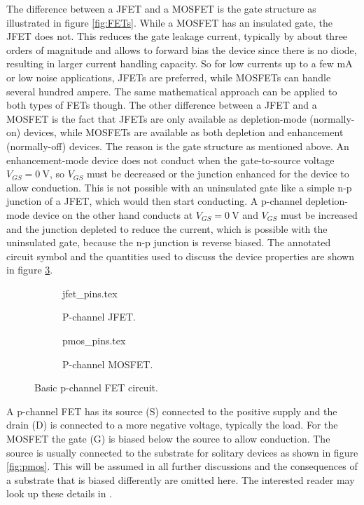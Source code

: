 The difference between a JFET and a MOSFET is the gate structure as illustrated in figure \ref{fig:FETs}. While a MOSFET has an insulated gate, the JFET does not. This reduces the gate leakage current, typically by about three orders of magnitude and allows to forward bias the device since there is no diode, resulting in larger current handling capacity. So for low currents up to a few \unit{\mA} or low noise applications, JFETs are preferred, while MOSFETs can handle several hundred ampere. The same mathematical approach can be applied to both types of FETs though. The other difference between a JFET and a MOSFET is the fact that JFETs are only available as depletion-mode (normally-on) devices, while MOSFETs are available as both depletion and enhancement (normally-off) devices. The reason is the gate structure as mentioned above. An enhancement-mode device does not conduct when the gate-to-source voltage $V_{GS} = \qty{0}{\V}$, so $V_{GS}$ must be decreased or the junction enhanced for the device to allow conduction. This is not possible with an uninsulated gate like a simple n-p junction of a JFET, which would then start conducting. A p-channel depletion-mode device on the other hand conducts at $V_{GS} = \qty{0}{\V}$ and $V_{GS}$ must be increased and the junction depleted to reduce the current, which is possible with the uninsulated gate, because the n-p junction is reverse biased. The annotated circuit symbol and the quantities used to discuss the device properties are shown in figure \ref{fig:fet_symbols}.
\begin{figure}[ht]
    \centering
    \begin{subfigure}{0.4\linewidth}
        \centering
        {jfet_pins.tex}
        \caption{P-channel JFET.}
        \label{fig:fet_symbols_jfet}
    \end{subfigure}
    \begin{subfigure}{0.4\linewidth}
        \centering
        {pmos_pins.tex}
        \caption{P-channel MOSFET.}
        \label{fig:fet_symbols_mosfet}
    \end{subfigure}
    \caption{Basic p-channel FET circuit.}
    \label{fig:fet_symbols}
\end{figure}

A p-channel FET has its source (S) connected to the positive supply and the drain (D) is connected to a more negative voltage, typically the load. For the MOSFET the gate (G) is biased below the source to allow conduction. The source is usually connected to the substrate for solitary devices as shown in figure \ref{fig:pmos}. This will be assumed in all further discussions and the consequences of a substrate that is biased differently are omitted here. The interested reader may look up these details in \cite{mosfet_details}.

